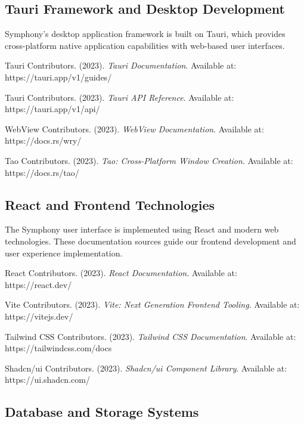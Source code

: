 \subsection*{Tauri Framework and Desktop Development}

Symphony's desktop application framework is built on Tauri, which provides cross-platform native application capabilities with web-based user interfaces.

\begin{compactlist}
    \item Tauri Contributors. (2023). \textit{Tauri Documentation}. Available at: https://tauri.app/v1/guides/
    \item Tauri Contributors. (2023). \textit{Tauri API Reference}. Available at: https://tauri.app/v1/api/
    \item WebView Contributors. (2023). \textit{WebView Documentation}. Available at: https://docs.rs/wry/
    \item Tao Contributors. (2023). \textit{Tao: Cross-Platform Window Creation}. Available at: https://docs.rs/tao/
\end{compactlist}

\subsection*{React and Frontend Technologies}

The Symphony user interface is implemented using React and modern web technologies. These documentation sources guide our frontend development and user experience implementation.

\begin{compactlist}
    \item React Contributors. (2023). \textit{React Documentation}. Available at: https://react.dev/
    \item Vite Contributors. (2023). \textit{Vite: Next Generation Frontend Tooling}. Available at: https://vitejs.dev/
    \item Tailwind CSS Contributors. (2023). \textit{Tailwind CSS Documentation}. Available at: https://tailwindcss.com/docs
    \item Shadcn/ui Contributors. (2023). \textit{Shadcn/ui Component Library}. Available at: https://ui.shadcn.com/
\end{compactlist}

\subsection*{Database and Storage Systems}

